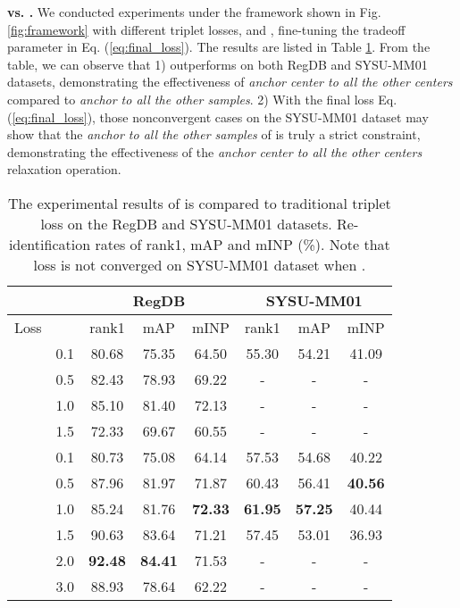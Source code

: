 \documentclass[journal]{IEEEtran}
\begin{document}
\textbf{ vs. .} We conducted experiments under the framework shown in Fig. \ref{fig:framework} with different triplet losses,  and , fine-tuning the tradeoff parameter  in Eq. (\ref{eq:final_loss}). The results are listed in Table \ref{tab:tri}.
From the table, we can observe that 1)  outperforms  on both RegDB and SYSU-MM01 datasets, demonstrating the effectiveness of \emph{anchor center to all the other centers} compared to \emph{anchor to all the other samples}.
2) With the final loss Eq. (\ref{eq:final_loss}), those nonconvergent cases on the SYSU-MM01 dataset may show that the \emph{anchor to all the other samples} of  is truly a strict constraint, demonstrating the effectiveness of the \emph{anchor center to all the other centers} relaxation operation.

\begin{table}
\caption{The experimental results of  is compared to traditional triplet loss  on the RegDB and SYSU-MM01 datasets. Re-identification rates of rank1, mAP and mINP (\%). Note that  loss is not converged on SYSU-MM01 dataset when .}
\label{tab:tri}
  \centering
\begin{tabular}{l|c|c|c|c|c|c|c}
   \toprule[2pt]
    \multicolumn{2}{c|}{} & \multicolumn{3}{c|}{RegDB} & \multicolumn{3}{c}{SYSU-MM01}\\ \hline
    Loss &  & rank1 & mAP & mINP & rank1 & mAP & mINP \\ \toprule[1pt]
    \multirow{4}{*}{}& 0.1 & 80.68 & 75.35 & 64.50 & 55.30 & 54.21 & 41.09\\
    & 0.5 & 82.43 & 78.93 & 69.22 & - & - & - \\
    & 1.0 & 85.10 & 81.40 & 72.13 & - & - & - \\
    & 1.5 & 72.33 & 69.67 & 60.55 & - & - & -  \\ \hline \hline
    \multirow{6}{*}{}& 0.1 &  80.73 & 75.08 & 64.14 & 57.53 & 54.68 & 40.22 \\
    &0.5 & 87.96 & 81.97 & 71.87 & 60.43 & 56.41 & \textbf{40.56} \\
    &1.0 & 85.24 & 81.76 & \textbf{72.33} &  \textbf{61.95} &\textbf{ 57.25} & 40.44 \\
    &1.5 & 90.63 & 83.64 & 71.21 & 57.45 & 53.01 & 36.93 \\
    &2.0 & \textbf{92.48} & \textbf{84.41} & 71.53 & - & - & - \\
    &3.0 & 88.93 & 78.64 & 62.22 & - & - & - \\ \toprule[2pt]
  \end{tabular}
\end{table}
\end{document}
